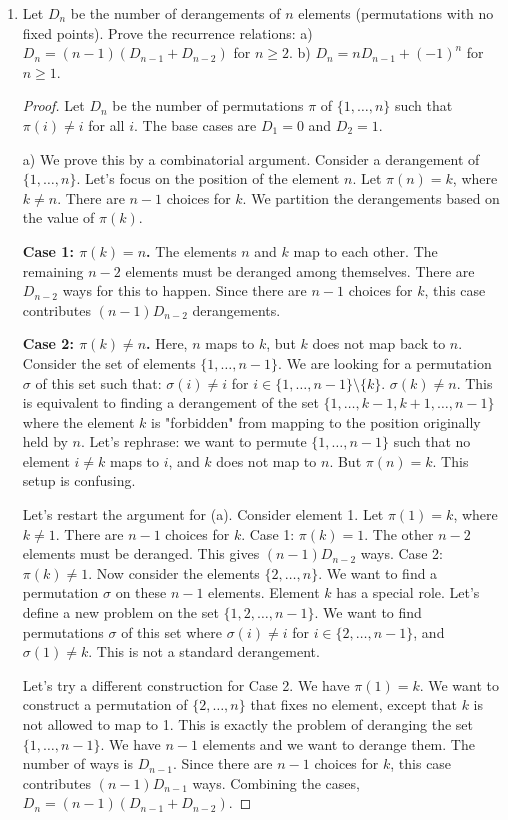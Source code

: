 \begin{enumerate}
    \item {} Let $D_n$ be the number of derangements of $n$ elements (permutations with no fixed points). Prove the recurrence relations:
    a) $D_n = (n-1)(D_{n-1} + D_{n-2})$ for $n \ge 2$.
    b) $D_n = n D_{n-1} + (-1)^n$ for $n \ge 1$.
    \begin{proof}
    Let $D_n$ be the number of permutations $\pi$ of $\{1, \dots, n\}$ such that $\pi(i) \neq i$ for all $i$.
    The base cases are $D_1=0$ and $D_2=1$.
    
    a) We prove this by a combinatorial argument. Consider a derangement of $\{1, \dots, n\}$. Let's focus on the position of the element $n$. Let $\pi(n)=k$, where $k \neq n$. There are $n-1$ choices for $k$. We partition the derangements based on the value of $\pi(k)$.
    
    \textbf{Case 1: $\pi(k)=n$. }
    The elements $n$ and $k$ map to each other. The remaining $n-2$ elements must be deranged among themselves. There are $D_{n-2}$ ways for this to happen. Since there are $n-1$ choices for $k$, this case contributes $(n-1)D_{n-2}$ derangements.
    
    \textbf{Case 2: $\pi(k) \neq n$. }
    Here, $n$ maps to $k$, but $k$ does not map back to $n$. Consider the set of elements $\{1, \dots, n-1\}$. We are looking for a permutation $\sigma$ of this set such that:
    $\sigma(i) \neq i$ for $i \in \{1, \dots, n-1\} \setminus \{k\}$.
    $\sigma(k) \neq n$.
    This is equivalent to finding a derangement of the set $\{1, \dots, k-1, k+1, \dots, n-1\}$ where the element $k$ is "forbidden" from mapping to the position originally held by $n$.
    Let's rephrase: we want to permute $\{1, \dots, n-1\}$ such that no element $i \neq k$ maps to $i$, and $k$ does not map to $n$. But $\pi(n)=k$. This setup is confusing.
    
    Let's restart the argument for (a). Consider element 1. Let $\pi(1)=k$, where $k \neq 1$. There are $n-1$ choices for $k$.
    Case 1: $\pi(k)=1$. The other $n-2$ elements must be deranged. This gives $(n-1)D_{n-2}$ ways.
    Case 2: $\pi(k) \neq 1$. Now consider the elements $\{2, \dots, n\}$. We want to find a permutation $\sigma$ on these $n-1$ elements. Element $k$ has a special role. Let's define a new problem on the set $\{1, 2, \dots, n-1\}$. We want to find permutations $\sigma$ of this set where $\sigma(i) \neq i$ for $i \in \{2, \dots, n-1\}$, and $\sigma(1) \neq k$. This is not a standard derangement.
    
    Let's try a different construction for Case 2. We have $\pi(1)=k$. We want to construct a permutation of $\{2, \dots, n\}$ that fixes no element, except that $k$ is not allowed to map to 1. This is exactly the problem of deranging the set $\{1, \dots, n-1\}$. We have $n-1$ elements and we want to derange them. The number of ways is $D_{n-1}$. Since there are $n-1$ choices for $k$, this case contributes $(n-1)D_{n-1}$ ways.
    Combining the cases, $D_n = (n-1)(D_{n-1} + D_{n-2})$.
    

\end{proof}
\end{enumerate}
